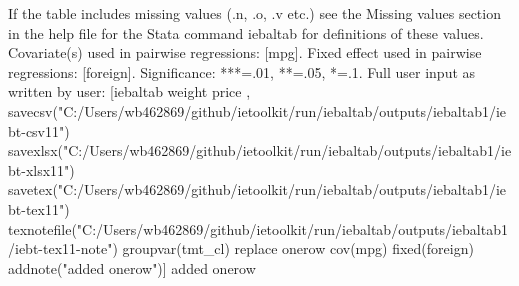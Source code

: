 If the table includes missing values (.n, .o, .v etc.) see the Missing values section in the help file for the Stata command iebaltab for definitions of these values. Covariate(s) used in pairwise regressions: [mpg]. Fixed effect used in pairwise regressions: [foreign]. Significance: ***=.01, **=.05, *=.1. Full user input as written by user: [iebaltab weight price , savecsv("C:/Users/wb462869/github/ietoolkit/run/iebaltab/outputs/iebaltab1/iebt-csv11") savexlsx("C:/Users/wb462869/github/ietoolkit/run/iebaltab/outputs/iebaltab1/iebt-xlsx11") savetex("C:/Users/wb462869/github/ietoolkit/run/iebaltab/outputs/iebaltab1/iebt-tex11") texnotefile("C:/Users/wb462869/github/ietoolkit/run/iebaltab/outputs/iebaltab1/iebt-tex11-note") groupvar(tmt\_cl) replace onerow cov(mpg) fixed(foreign) addnote("added onerow")] added onerow
